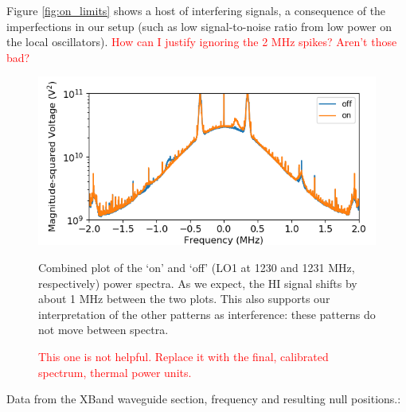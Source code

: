 \documentclass[12pt]{article}
\begin{document}
Figure \ref{fig:on_limits} shows a host of interfering signals, a consequence of the imperfections in our setup (such as low signal-to-noise ratio from low power on the local oscillators). \textcolor{red}{How can I justify ignoring the 2 MHz spikes? Aren't those bad?}

\begin{figure}
\centering
\begin{minipage}{.45\textwidth}
	\centering
	\includegraphics[width=\linewidth]{up_on_off}
	\caption{Combined plot of the `on' and `off' (LO1 at 1230 and 1231 MHz, respectively) power spectra. As we expect, the HI signal shifts by about 1 MHz between the two plots. This also supports our interpretation of the other patterns as interference: these patterns do not move between spectra.}
	\label{fig:up_on_off}
\end{minipage} \hfill%
\begin{minipage}{.45\textwidth}
	\centering
	\caption{\textcolor{red}{This one is not helpful. Replace it with the final, calibrated spectrum, thermal power units.}}
	\label{fig:up_shape}
\end{minipage}
\end{figure}




Data from the XBand waveguide section, frequency and resulting null positions.:
\end{document}
